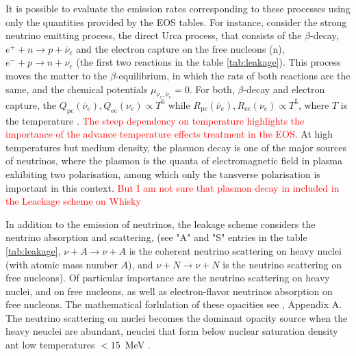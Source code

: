 \documentclass[11pt,a4paper,headinclude=true,DIV=14,BCOR=8mm,chapterprefix,listof=totoc,twoside,openright,abstracton]{scrbook}
\newcommand{\red}[1]{\textcolor{red}{#1}}
\begin{document}
It is possible to evaluate the emission rates corresponding to these processes using only the quantities provided by the EOS tables.
For instance, consider the strong neutrino emitting process, the direct Urca process, that consists of the $\beta$-decay, $e^+ + n \rightarrow p + \bar{\nu}_e$ and the electron capture on the free nucleons (n), $e^{-} + p \rightarrow n + \nu_e$ (the first two reactions in the table \ref{tab:leakage}). 
This process moves the matter to the $\beta$-equilibrium, in which the rats of both reactions are the same, and the chemical potentials $\mu_{\nu_e,\bar{\nu}_e}=0$.
For both, $\beta$-decay and electron capture, the $Q_{\text{pc}}(\bar{\nu}_e),Q_{\text{ec}}({\nu_e}) \propto T^{6}$ while $R_{\text{pc}}(\bar{\nu}_e),R_{\text{ec}}(\nu_e)\propto T^5$, where $T$ is the temperature \cite{Bruenn:1985}.
\red{The steep dependency on temperature highlights the importance of the advance temperature effects treatment in the EOS}.
At high temperatures but medium density, the plasmon decay is one of the major sources of neutrinos, where the plasmon is the quanta of electromagnetic field in plasma exhibiting two polarisation, among which only the tansverse polarisation is important in this context.
\cite{P. J. Schinder, D. N. Schramm, P. J.Wiita, S. H. Margolis, and D. L. Tubbs, Astrophys. J. 313, 531 (1987).} 
\red{But I am not sure that plasmon decay in included in the Leackage scheme on Whisky}

In addition to the emission of neutrinos, the leakage scheme considers the neutrino absorption and scattering, (see "A" and "S" entries in the table \ref{tab:leakage}, $\nu+A\rightarrow\nu+A$ is the coherent neutrino scattering on heavy nuclei (with atomic mass number $A$), and $\nu+N\rightarrow\nu+N$ is the neutrino scattering on free nucleons).
Of particular importance are the neutrino scattering on heavy nuclei, and on free nucleons, as well as electron-flavor neutrinos absorption on free nucleons. The mathematical forlulation of these opacities see \cite{Galeazzi:2013mia}, Appendix A.
The neutrino scattering on nuclei becomes the dominant opacity source when the heavy neuclei are abundant, neuclei that form below nuclear saturation density ant low temperatures $<15$~MeV \cite{Rosswog:2003rv}.
\end{document}
